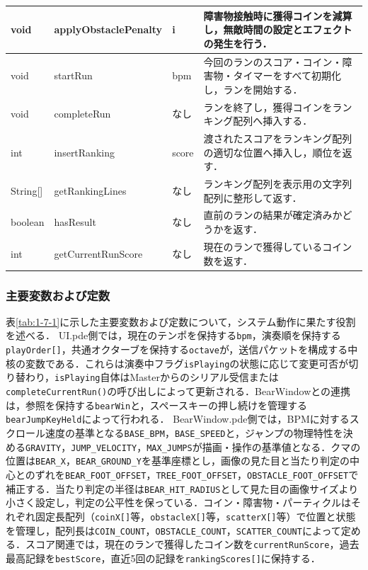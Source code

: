 \documentclass[uplatex,dvipdfmx]{jlreq}
\begin{document}
{\begin{tabularx}{\textwidth}{|M{1.6cm}|M{3.3cm}|M{2.1cm}|Y|}
    void & applyObstaclePenalty & i & 障害物接触時に獲得コインを減算し，無敵時間の設定とエフェクトの発生を行う． \\ \hline
    void & startRun & bpm & 今回のランのスコア・コイン・障害物・タイマーをすべて初期化し，ランを開始する． \\ \hline
    void & completeRun & なし & ランを終了し，獲得コインをランキング配列へ挿入する． \\ \hline
    int & insertRanking & score & 渡されたスコアをランキング配列の適切な位置へ挿入し，順位を返す． \\ \hline
    String[] & getRankingLines & なし & ランキング配列を表示用の文字列配列に整形して返す． \\ \hline
    boolean & hasResult & なし & 直前のランの結果が確定済みかどうかを返す． \\ \hline
    int & getCurrentRunScore & なし & 現在のランで獲得しているコイン数を返す． \\ \hline
\end{tabularx}
}

\subsubsection{主要変数および定数}

表\ref{tab:1-7-1}に示した主要変数および定数について，システム動作に果たす役割を述べる．
UI.pde側では，現在のテンポを保持する\texttt{bpm}，演奏順を保持する\texttt{playOrder[]}，共通オクターブを保持する\texttt{octave}が，送信パケットを構成する中核の変数である．これらは演奏中フラグ\texttt{isPlaying}の状態に応じて変更可否が切り替わり，\texttt{isPlaying}自体はMasterからのシリアル受信または\texttt{completeCurrentRun()}の呼び出しによって更新される．BearWindowとの連携は，参照を保持する\texttt{bearWin}と，スペースキーの押し続けを管理する\texttt{bearJumpKeyHeld}によって行われる．
BearWindow.pde側では，BPMに対するスクロール速度の基準となる\texttt{BASE\_BPM}，\texttt{BASE\_SPEED}と，ジャンプの物理特性を決める\texttt{GRAVITY}，\texttt{JUMP\_VELOCITY}，\texttt{MAX\_JUMPS}が描画・操作の基準値となる．クマの位置は\texttt{BEAR\_X}，\texttt{BEAR\_GROUND\_Y}を基準座標とし，画像の見た目と当たり判定の中心とのずれを\texttt{BEAR\_FOOT\_OFFSET}，\texttt{TREE\_FOOT\_OFFSET}，\texttt{OBSTACLE\_FOOT\_OFFSET}で補正する．当たり判定の半径は\texttt{BEAR\_HIT\_RADIUS}として見た目の画像サイズより小さく設定し，判定の公平性を保っている．コイン・障害物・パーティクルはそれぞれ固定長配列（\texttt{coinX[]}等，\texttt{obstacleX[]}等，\texttt{scatterX[]}等）で位置と状態を管理し，配列長は\texttt{COIN\_COUNT}，\texttt{OBSTACLE\_COUNT}，\texttt{SCATTER\_COUNT}によって定める．スコア関連では，現在のランで獲得したコイン数を\texttt{currentRunScore}，過去最高記録を\texttt{bestScore}，直近5回の記録を\texttt{rankingScores[]}に保持する．
\end{document}
